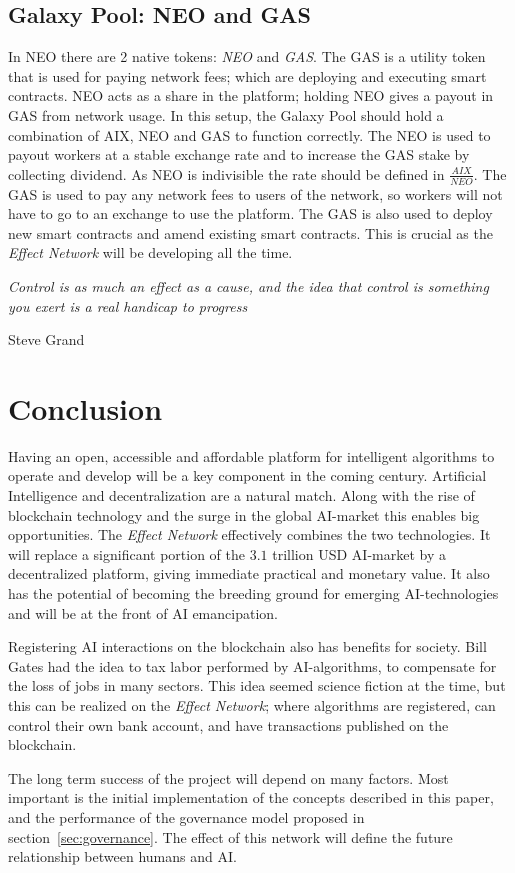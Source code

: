\documentclass{article}
\begin{document}
\subsection{Galaxy Pool: NEO and GAS}
In NEO there are 2 native tokens: \emph{NEO} and \emph{GAS}. The GAS
is a utility token that is used for paying network fees; which are
deploying and executing smart contracts. NEO acts as a share in the
platform; holding NEO gives a payout in GAS from network usage. In
this setup, the Galaxy Pool should hold a combination of AIX, NEO and
GAS to function correctly. The NEO is used to payout workers at a
stable exchange rate and to increase the GAS stake by collecting dividend. As
NEO is indivisible the rate should be defined in
$\frac{AIX}{NEO}$. The GAS is used to pay any network fees to users of
the network, so workers will not have to go to an exchange to use the
platform. The GAS is also used to deploy new smart contracts and amend
existing smart contracts. This is crucial as the \emph{Effect Network}
will be developing all the time.

\newpage
\epigraph{\textit{Control is as much an effect as a cause, and the
    idea that control is something you exert is a real handicap to
    progress}}{Steve Grand}
\section{Conclusion}

Having an open, accessible and affordable platform for intelligent
algorithms to operate and develop will be a key component
in the coming century. Artificial Intelligence and decentralization
are a natural match. Along with the rise of blockchain technology and
the surge in the global AI-market this enables big opportunities. The
\emph{Effect Network} effectively combines the two technologies. It will
replace a significant portion of the $3.1$ trillion USD AI-market by a
decentralized platform, giving immediate practical and monetary
value. It also has the potential of becoming the breeding ground for
emerging AI-technologies and will be at the front of AI emancipation.

Registering AI interactions on the blockchain also has benefits for
society. Bill Gates had the idea to tax labor performed by
AI-algorithms, to compensate for the loss of jobs in many sectors. This
idea seemed science fiction at the time, but this can be realized on the 
\emph{Effect Network}; where algorithms are registered, can control
their own bank account, and have transactions published on the
blockchain.

The long term success of the project will depend on many factors. Most
important is the initial implementation of the concepts described in
this paper, and the performance of the governance model proposed in
section~\ref{sec:governance}. The effect of this network will define the future relationship between humans and AI.



\end{document}
